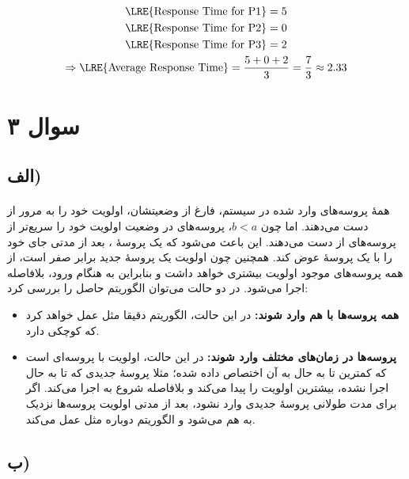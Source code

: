 \documentclass{article}
\begin{document}
	\begin{gather*}
		\textrm{\LRE{Response Time for P1}} = 5 \\
		\textrm{\LRE{Response Time for P2}} = 0 \\
		\textrm{\LRE{Response Time for P3}} = 2 \\
		\Rightarrow
		\textrm{\LRE{Average Response Time}} =
		\frac{5 + 0 + 2}{3} = \frac{7}{3} \approx 2.33
	\end{gather*}

	\section*{سوال ۳}

	\subsection*{الف)}
	\paragraph*{}
	همهٔ پروسه‌های وارد شده در سیستم، فارغ از وضعیتشان، اولویت خود را به مرور از دست می‌دهند. اما چون
	$b < a$،
	پروسه‌های در وضعیت
	اولویت خود را سریع‌تر از پروسه‌های
	از دست می‌دهند. این باعث می‌شود که یک پروسهٔ
	،
	بعد از مدتی جای خود را با یک پروسهٔ
	عوض کند. همچنین چون اولویت یک پروسهٔ جدید برابر صفر است، از همه پروسه‌های موجود اولویت بیشتری خواهد داشت و بنابراین به هنگام ورود، بلافاصله اجرا می‌شود. در دو حالت می‌توان الگوریتم حاصل را بررسی کرد:

	\begin{itemize}
		\item{\textbf{همه پروسه‌ها با هم وارد شوند:}}
		در این حالت، الگوریتم دقیقا مثل
		عمل خواهد کرد که
		کوچکی دارد.

		\item{\textbf{پروسه‌ها در زمان‌های مختلف وارد شوند:}}
		در این حالت، اولویت با پروسه‌ای است که کمترین
		تا به حال به آن اختصاص داده شده؛ مثلا پروسهٔ جدیدی که تا به حال اجرا نشده، بیشترین اولویت را پیدا می‌کند و بلافاصله شروع به اجرا می‌کند. اگر برای مدت طولانی پروسهٔ جدیدی وارد نشود، بعد از مدتی اولویت پروسه‌ها نزدیک به هم می‌شود و الگوریتم دوباره مثل
		عمل می‌کند.
	\end{itemize}

	\subsection*{ب)}
\end{document}
